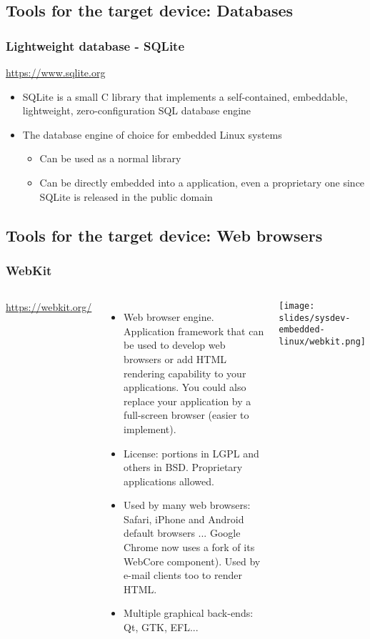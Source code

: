 \subsection[Databases]{Tools for the target device: Databases}

\begin{frame}
  \frametitle{Lightweight database - SQLite}
  \url{https://www.sqlite.org}

  \begin{itemize}
  \item SQLite is a small C library that implements a self-contained,
    embeddable, lightweight, zero-configuration SQL database engine
  \item The database engine of choice for embedded Linux systems
    \begin{itemize}
    \item Can be used as a normal library
    \item Can be directly embedded into a application, even a
      proprietary one since SQLite is released in the public domain
    \end{itemize}
  \end{itemize}
\end{frame}

\subsection[Web Browsers]{Tools for the target device: Web browsers}

\begin{frame}
  \frametitle{WebKit}
  \begin{columns}[T]
    \url{https://webkit.org/}
    \begin{itemize}
    \item Web browser engine. Application framework that can be used
      to develop web browsers or add HTML rendering capability to
      your applications. You could also replace your application
      by a full-screen browser (easier to implement).
    \item License: portions in LGPL and others in BSD. Proprietary
      applications allowed.
    \item Used by many web browsers: Safari, iPhone and Android default
      browsers ... Google Chrome now uses a fork of its WebCore component).
      Used by e-mail clients too to render HTML.
    \item Multiple graphical back-ends: Qt, GTK, EFL...
    \end{itemize}
    \texttt{[image: slides/sysdev-embedded-linux/webkit.png]}
  \end{columns}
\end{frame}

